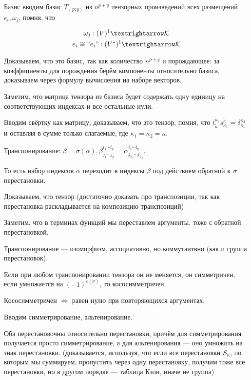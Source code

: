 \documentclass[12pt, a4paper]{article}
\begin{document}
Базис вводим базис $T_{(p; q)}$ 
из $n^{p + q}$ тензорных произведений всех размещений $e_i, \omega_j$,
помня, что 

\begin{gather*}
    \omega_j : (V)^1 → \mathcal{K} \\
    e_i \cong "e_i" : (V^*)^1 → \mathcal{K}
\end{gather*}

Доказываем, что это базис, так как количество $n^{p + q}$ 
и порождающее: за коэффициенты для порождения берём 
компоненты относительно базиса, доказываем через формулу вычисления на наборе векторов.

Заметим, что матрица тензора из базиса будет содержать одну единицу 
на соответствующих индексах и все остальные нули.

Вводим свёртку как матрицу, доказываем, что это тензор, помня, что 
$t_{\tilde{\kappa}}^{\kappa_{2}} s_{\kappa_{1}}^{\tilde{\kappa}} = \delta_{\kappa_{1}}^{\kappa_{2}}$ 
и оставляя в сумме только слагаемые, где $\kappa_{1}=\kappa_{2}=\kappa$.

Транспонирование: $\beta = \sigma(\alpha), \beta_{j_{1} \cdots j_{p}}^{i_{1} \cdots i_{q}}=\alpha_{j_{\sigma_{1}} \cdots j_{\sigma_{p}}}^{i_{1} \cdots i_{q}}$.

То есть набор индексов $\alpha$ переходит в индексы $\beta$ 
под действием обратной к $\sigma$ перестановки.

Доказываем, что тензор 
(достаточно доказать про транспозиции, 
так как перестановка раскладывается на композицию транспозиций) 

Заметим, что в терминах функций мы переставлем аргументы, тоже с обратной перестановкой.

Транспонирование — изоморфизм, ассоциативно, но коммутаитвно (как и группа перестановок).

Если при любом транспонировании тензора он не меняется, он симметричен, 
если умножается на $(-1)^{\varepsilon(\sigma)}$, то кососимметричен.

Кососимметричен $\Leftrightarrow$ равен нулю при повторяющихся аргументах.

Вводим симметрирование, альтенирование.

Оба перестановочны относительно перестановки, 
причём для симметрирования получается просто симметрирование,
а для альтенирования — оно умножить на знак перестановки.
(доказывается, используя, что если все перестановки $S_n$, по которым мы суммируем,
пропустить через одну перестановку, получим тоже все перестановки, но в другом порядке — таблица Кэли, иначе не группа)
\end{document}
